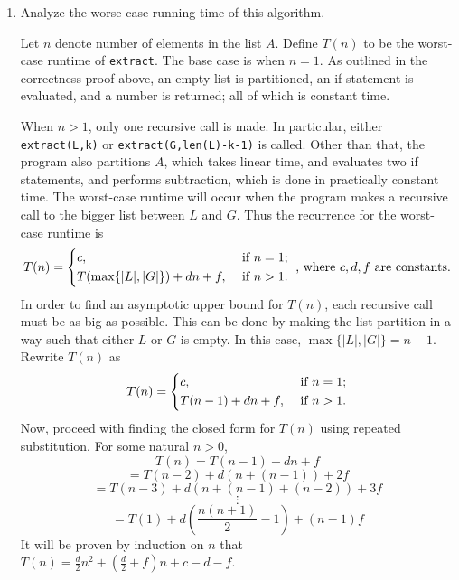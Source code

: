 \documentclass[11pt]{article}
\begin{document}
\begin{enumerate}[label=(\alph*)]
\begin{proof}
            Indeed, the program returns \verb|extract(G, k - len(L) - 1)|, which by the induction hypothesis returns the \((k - \texttt{len}(A) - 1)\)th smallest element of \(G\), which is the \(k\)th smallest element of \(A\).

            Thus the program returns the correct output for lists of size \(n+1\), and by the principle of complete induction, the program is correct.
            
        \end{proof}
        \item Analyze the worse-case running time of this algorithm.
        
        Let \(n\) denote number of elements in the list \(A\). Define \(T(n)\) to be the worst-case runtime of \verb|extract|. The base case is when \(n=1\). As outlined in the correctness proof above, an empty list is partitioned, an if statement is evaluated, and a number is returned; all of which is constant time.

        When \(n > 1\), only one recursive call is made. In particular, either \verb|extract(L,k)| or \verb|extract(G,len(L)-k-1)| is called. Other than that, the program also partitions \(A\), which takes linear time, and evaluates two if statements, and performs subtraction, which is done in practically constant time. The worst-case runtime will occur when the program makes a recursive call to the bigger list between \(L\) and \(G\). Thus the recurrence for the worst-case runtime is
        \[
            T(n)= \begin{dcases}
                c, &\text{ if } n=1 ;\\
                T(\max \{|L|,|G|\}) + dn + f, &\text{ if } n > 1 .
            \end{dcases}
            \text{ , where } c,d,f \text{ are constants.}
        \]
        In order to find an asymptotic upper bound for \(T(n)\), each recursive call must be as big as possible. This can be done by making the list partition in a way such that either \(L\) or \(G\) is empty. In this case, \(\max \{|L|,|G|\} = n-1\). Rewrite \(T(n)\) as
        \[
            T(n)= \begin{dcases}
                c, &\text{ if } n=1 ;\\
                T(n-1) + dn + f, &\text{ if } n > 1 .
            \end{dcases}
        \]
        Now, proceed with finding the closed form for \(T(n)\) using repeated substitution. For some natural \(n>0\),
        \[
            T(n) = T(n-1) + dn + f
        \]
        \[
            = T(n-2) + d(n + (n-1)) + 2f
        \]
        \[
            = T(n-3) + d(n + (n-1) + (n-2)) + 3f
        \]
        \[
            \vdots
        \]
        \[
            = T(1) + d\left(\frac{n(n+1)}{2} - 1\right) + (n-1)f
        \]
        It will be proven by induction on \(n\) that \(T(n) = \frac{d}{2}n^2 + (\frac{d}{2} + f)n + c-d-f\).


\end{enumerate}
\end{document}
